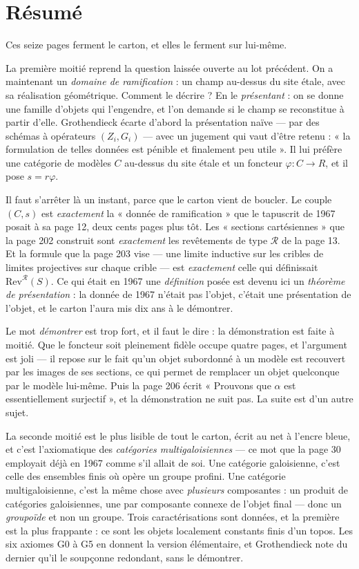 \documentclass[11pt,a4paper]{article}
\begin{document}
\section*{Résumé}

\begin{resume}
Ces seize pages ferment le carton, et elles le ferment sur lui-même.

La première moitié reprend la question laissée ouverte au lot précédent. On a
maintenant un \emph{domaine de ramification} : un champ au-dessus du site
étale, avec sa réalisation géométrique. Comment le décrire ? En le
\emph{présentant} : on se donne une famille d'objets qui l'engendre, et l'on
demande si le champ se reconstitue à partir d'elle. Grothendieck écarte d'abord
la présentation naïve --- par des schémas à opérateurs $(Z_{i}, G_{i})$ --- avec
un jugement qui vaut d'être retenu : « la formulation de telles données est
pénible et finalement peu utile ». Il lui préfère une catégorie de modèles $C$
au-dessus du site étale et un foncteur $\varphi : C \to R$, et il pose
$s = r\varphi$.

Il faut s'arrêter là un instant, parce que le carton vient de boucler. Le
couple $(C, s)$ est \emph{exactement} la « donnée de ramification » que le
tapuscrit de 1967 posait à sa page 12, deux cents pages plus tôt. Les
« sections cartésiennes » que la page 202 construit sont \emph{exactement} les
revêtements de type $\mathcal{R}$ de la page 13. Et la formule que la page 203
vise --- une limite inductive sur les cribles de limites projectives sur chaque
crible --- est \emph{exactement} celle qui définissait
$\mathrm{Rev}^{\mathcal{R}}(S)$. Ce qui était en 1967 une \emph{définition}
posée est devenu ici un \emph{théorème de présentation} : la donnée de 1967
n'était pas l'objet, c'était une présentation de l'objet, et le carton l'aura
mis dix ans à le démontrer.

Le mot \emph{démontrer} est trop fort, et il faut le dire : la démonstration
est faite à moitié. Que le foncteur soit pleinement fidèle occupe quatre pages,
et l'argument est joli --- il repose sur le fait qu'un objet subordonné à un
modèle est recouvert par les images de ses sections, ce qui permet de remplacer
un objet quelconque par le modèle lui-même. Puis la page 206 écrit « Prouvons
que $\alpha$ est essentiellement surjectif », et la démonstration ne suit pas.
La suite est d'un autre sujet.

La seconde moitié est le plus lisible de tout le carton, écrit au net à l'encre
bleue, et c'est l'axiomatique des \emph{catégories multigaloisiennes} --- ce
mot que la page 30 employait déjà en 1967 comme s'il allait de soi. Une
catégorie galoisienne, c'est celle des ensembles finis où opère un groupe
profini. Une catégorie multigaloisienne, c'est la même chose avec
\emph{plusieurs} composantes : un produit de catégories galoisiennes, une par
composante connexe de l'objet final --- donc un \emph{groupoïde} et non un
groupe. Trois caractérisations sont données, et la première est la plus
frappante : ce sont les objets localement constants finis d'un topos. Les six
axiomes G0 à G5 en donnent la version élémentaire, et Grothendieck note du
dernier qu'il le soupçonne redondant, sans le démontrer.


\end{resume}
\end{document}
